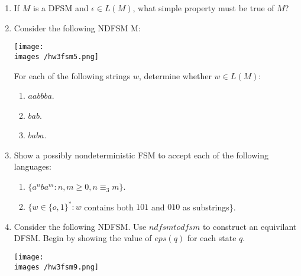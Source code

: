 \documentclass[10pt]{article}
\newcommand{\images}{/home/gparker/classes/341/images}
\begin{document}
\begin{enumerate}

\item
If $M$ is a DFSM and $\epsilon \in L(M)$, what simple property must be true of $M$?

\pagebreak

\item
Consider the following NDFSM M: \\

\begin{center}
\texttt{[image: \\images /hw3fsm5.png]}
\end{center}

For each of the following strings $w$, determine whether $w \in L(M)$:
\begin{enumerate}
\item
$aabbba$.

\item
$bab$.

\item
$baba$.
\end{enumerate}

\item
Show a possibly nondeterministic FSM to accept each of the following languages:
\begin{enumerate}

\item
$\{a^nba^m : n, m \geq 0, n \equiv _3 m\}$.

\item
$\{w \in \{o, 1\}^* : w$ contains both $101$ and $010$ as substrings\}.
\end{enumerate}


\pagebreak
\addtocounter{enumi}{2}

\item
Consider the following NDFSM. Use $ndfsmtodfsm$ to construct an equivilant DFSM.  Begin by showing the value of $eps(q)$ for each state $q$.

\begin{center}
\texttt{[image: \\images /hw3fsm9.png]}
\end{center}
\end{enumerate}
\end{document}
